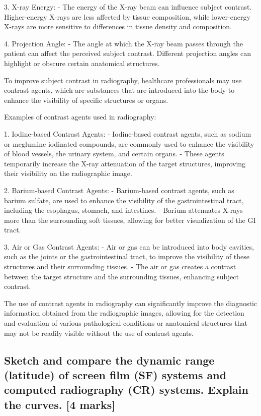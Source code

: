 \documentclass{assignment}
\begin{document}
\begin{problem}
{3. X-ray Energy:
   - The energy of the X-ray beam can influence subject contrast. Higher-energy X-rays are less affected by tissue composition, while lower-energy X-rays are more sensitive to differences in tissue density and composition.

4. Projection Angle:
   - The angle at which the X-ray beam passes through the patient can affect the perceived subject contrast. Different projection angles can highlight or obscure certain anatomical structures.

To improve subject contrast in radiography, healthcare professionals may use contrast agents, which are substances that are introduced into the body to enhance the visibility of specific structures or organs.

Examples of contrast agents used in radiography:

1. Iodine-based Contrast Agents:
   - Iodine-based contrast agents, such as sodium or meglumine iodinated compounds, are commonly used to enhance the visibility of blood vessels, the urinary system, and certain organs.
   - These agents temporarily increase the X-ray attenuation of the target structures, improving their visibility on the radiographic image.

2. Barium-based Contrast Agents:
   - Barium-based contrast agents, such as barium sulfate, are used to enhance the visibility of the gastrointestinal tract, including the esophagus, stomach, and intestines.
   - Barium attenuates X-rays more than the surrounding soft tissues, allowing for better visualization of the GI tract.

3. Air or Gas Contrast Agents:
   - Air or gas can be introduced into body cavities, such as the joints or the gastrointestinal tract, to improve the visibility of these structures and their surrounding tissues.
   - The air or gas creates a contrast between the target structure and the surrounding tissues, enhancing subject contrast.

The use of contrast agents in radiography can significantly improve the diagnostic information obtained from the radiographic images, allowing for the detection and evaluation of various pathological conditions or anatomical structures that may not be readily visible without the use of contrast agents.}
\subsection{Sketch and compare the dynamic range (latitude) of screen film (SF) systems and computed radiography (CR) systems. Explain the curves. [4 marks]
}

\end{problem}
\end{document}
